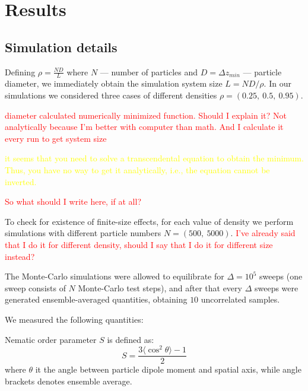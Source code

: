 \section{Results}
\subsection{Simulation details}
\label{subsec:simulation_details}

Defining $\rho = \frac{N D}{L}$ where $N$ --- number of particles and $D = \Delta z_{min}$ --- particle diameter, we immediately obtain the simulation system size $L = N D/ \rho$. In our simulations we considered three cases of different densities $\rho = (0.25,\ 0.5,\ 0.95)$.

\textcolor{red}{diameter calculated numerically minimized function. Should I explain it? Not analytically because I'm better with computer than math. And I calculate it every run to get system size}

\textcolor{yellow}{it seems that you need to solve a transcendental equation to obtain the minimum. Thus, you have no way to get it analytically, i.e., the equation cannot be inverted.}

\textcolor{red}{So what should I write here, if at all?}

To check for existence of finite-size effects, for each value of density we perform simulations with different particle numbers $N = (500,\ 5000)$. \textcolor{red}{I've already said that I do it for different density, should I say that I do it for different size instead?}

The Monte-Carlo simulations were allowed to equilibrate for $\Delta = 10^5$ sweeps (one sweep consists of $N$ Monte-Carlo test steps), and after that every $\Delta$ sweeps were generated ensemble-averaged quantities, obtaining $10$ uncorrelated samples.


We measured the following quantities:

Nematic order parameter $S$ is defined as:
\begin{equation}
\label{eq:nematic_order_parameter}
	S = \frac{3 \langle\cos^2 \theta\rangle - 1}{2}
\end{equation}
where $\theta$ it the angle between particle dipole moment and spatial axis, while angle brackets denotes ensemble average.

